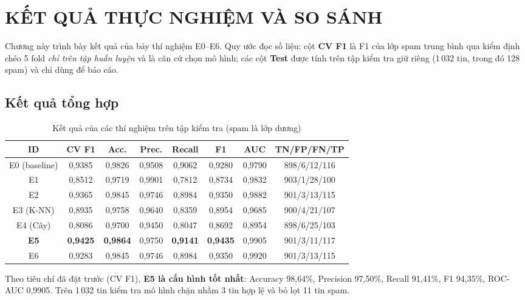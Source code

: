 \chapter{KẾT QUẢ THỰC NGHIỆM VÀ SO SÁNH}

Chương này trình bày kết quả của bảy thí nghiệm E0--E6. Quy ước đọc số liệu: cột \textbf{CV F1} là F1 của lớp spam trung bình qua kiểm định chéo 5 fold \textit{chỉ trên tập huấn luyện} và là căn cứ chọn mô hình; các cột \textbf{Test} được tính trên tập kiểm tra giữ riêng (1\,032 tin, trong đó 128 spam) và chỉ dùng để báo cáo.

\section{Kết quả tổng hợp}

\begin{table}[H]
\centering
\caption{Kết quả của các thí nghiệm trên tập kiểm tra ($\text{spam}$ là lớp dương)}
\label{tab:ket-qua}
\small
\begin{tabular}{|c|c|c|c|c|c|c|c|}
\hline
\textbf{ID} & \textbf{CV F1} & \textbf{Acc.} & \textbf{Prec.} & \textbf{Recall} & \textbf{F1} & \textbf{AUC} & \textbf{TN/FP/FN/TP} \\
\hline
E0 (baseline) & 0,9385 & 0,9826 & 0,9508 & 0,9062 & 0,9280 & 0,9790 & 898/6/12/116 \\
\hline
E1 & 0,8512 & 0,9719 & 0,9901 & 0,7812 & 0,8734 & 0,9832 & 903/1/28/100 \\
\hline
E2 & 0,9365 & 0,9845 & 0,9746 & 0,8984 & 0,9350 & 0,9882 & 901/3/13/115 \\
\hline
E3 (K-NN) & 0,8935 & 0,9758 & 0,9640 & 0,8359 & 0,8954 & 0,9685 & 900/4/21/107 \\
\hline
E4 (Cây) & 0,8086 & 0,9700 & 0,9450 & 0,8047 & 0,8692 & 0,8954 & 898/6/25/103 \\
\hline
\textbf{E5} & \textbf{0,9425} & \textbf{0,9864} & 0,9750 & \textbf{0,9141} & \textbf{0,9435} & 0,9905 & 901/3/11/117 \\
\hline
E6 & 0,9283 & 0,9845 & 0,9746 & 0,8984 & 0,9350 & 0,9920 & 901/3/13/115 \\
\hline
\end{tabular}
\end{table}

Theo tiêu chí đã đặt trước (CV F1), \textbf{E5 là cấu hình tốt nhất}: Accuracy 98,64\%, Precision 97,50\%, Recall 91,41\%, F1 94,35\%, ROC-AUC 0,9905. Trên 1\,032 tin kiểm tra mô hình chặn nhầm 3 tin hợp lệ và bỏ lọt 11 tin spam.

